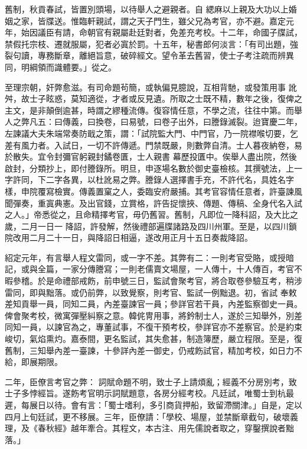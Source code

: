 \begin{pinyinscope}
 舊制，秋貢春試，皆置別頭場，以待舉人之避親者。自
 緦麻以上親及大功以上婚姻之家，皆牒送。惟臨軒親試，謂之天子門生，雖父兄為考官，亦不避。嘉定元年，始因議臣有請，命朝官有親屬赴廷對者，免差充考校。十二年，命國子牒試，禁假托宗枝、遷就服屬，犯者必寘於罰。十五年，秘書郎何淡言：「有司出題，強裂句讀，專務斷章，離絕旨意，破碎經文。望令革去舊習，使士子考注疏而辨異同，明綱領而識體要。」從之。



 至理宗朝，奸弊愈滋。有司命題茍簡，或執偏見臆說，互相背馳，或發策用事
 訛舛，故士子眩惑，莫知適從，才者或反見遺。所取之士既不精，數年之後，復俾之主文，是非顛倒逾甚，時謂之繆種流傳。復容情任意，不學之流，往往中第。而舉人之弊凡五：曰傳義，曰換卷，曰易號，曰卷子出外，曰謄錄滅裂。迨寶慶二年，左諫議大夫朱端常奏防戢之策，謂：「試院監大門、中門官，乃一院襟喉切要，乞差有風力者。入試日，一切不許傳遞。門禁既嚴，則數弊自清。士人暮夜納卷，易於散失。宜令封彌官躬親封鐍卷匱，士人親書
 幕歷投匱中。俟舉人盡出院，然後啟封，分類抄上，即付謄錄所。明旦，申逐場名數於御史臺檢核。其撰號法，上一字許同，下二字各異，以杜訛易之弊。謄錄人選擇書手充，不許代名，具姓名字樣，申院覆寫檢實。傳義置窠之人，委臨安府嚴捕。其考官容情任意者，許臺諫風聞彈奏，重寘典憲。及出官錢，立賞格，許告捉懷挾、傳題、傳稿、全身代名入試之人。」帝悉從之，且命精擇考官，毋仍舊習。舊制，凡即位一降科詔，及大比之歲，二月一日一
 降詔，許發解，然後禮部遍牒諸路及四川州軍。至是，以四川鎖院改用二月二十一日，與降詔日相逼，遂改用正月十五日奏裁降詔。



 紹定元年，有言舉人程文雷同，或一字不差。其弊有二：一則考官受賂，或授暗記，或與全篇，一家分傳謄寫；一則老儒賣文場屋，一人傳十，十人傳百，考官不暇參稽。於是命禮部戒飭，前申號三日，監試會聚考官，將合取卷參驗互考，稍涉雷同，即與黜落。或仍前弊，以致覺察，則考官、監試一例黜退。初，省試
 奉敕差知貢舉一員，同知二員，內差臺諫官一員；參詳官若干員，內差監察御史一員。俾會聚考校，微寓彈壓糾察之意。韓侂冑用事，將鈐制士人，遂於三知舉外，別差同知一員，以諫官為之，專董試事，不復干預考校，參詳官亦不差察官。於是約束峻切，氣焰熏灼。嘉泰間，更名監試，其失愈甚，制造簿歷，嚴立程限。至是，復舊制，三知舉內差一臺諫，十參詳內差一御史，仍戒飭試官，精加考校，如日力不給，即展期限。



 二年，臣僚言考官之弊：
 詞賦命題不明，致士子上請煩亂；經義不分房別考，致士子多悖經旨。遂飭考官明示詞賦題意，各房分經考校。凡廷試，唯蜀士到杭最遲，每展日以待。會有言：「蜀士嗜利，多引商貨押船，致留滯關津。」自是，定以四月上旬廷試，更不移展。三年，臣僚請：「學校、場屋，並禁斷章截句，破壞義理，及《春秋經》越年牽合。其程文，本古注、用先儒說者取之，穿鑿撰說者黜落。」




\end{pinyinscope}
